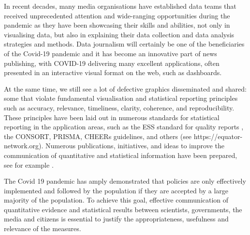\documentclass[article]{jdssv}\usepackage[]{graphicx}\usepackage[]{color}
\begin{document}
In recent decades, many media organisations have established data teams that received unprecedented attention and wide-ranging opportunities during the pandemic as they have been showcasing their skills and abilities, not only in visualising data, but also in explaining their data collection and data analysis strategies and methods. Data journalism will certainly be one of the beneficiaries of the Covid-19 pandemic and it has become an innovative part of news publishing, with COVID-19 delivering many excellent applications, often presented in an interactive visual format on the web, such as dashboards.


At the same time, we still see a lot of defective graphics disseminated and shared: some that violate fundamental visualisation and statistical reporting principles such as accuracy, relevance, timeliness, clarity, coherence, and reproducibility. These principles have been laid out in numerous standards for statistical reporting in the application areas, such as the ESS standard for quality reports \citep{ess2009}, the CONSORT, PRISMA, CHEERs guidelines, and others (see https://equator-network.org). Numerous publications, initiatives, and ideas to improve the communication of quantitative and statistical information have been prepared, see for example \cite{Hoffrage2261,Tufte2001,Rosling2011,otavamylona2020}.

The Covid 19 pandemic has amply demonstrated that policies are only effectively implemented and followed by the population if they are accepted by a large majority of the population. To achieve this goal, effective communication of quantitative evidence and statistical results between scientists, governments, the media and citizens is essential to justify the appropriateness, usefulness and relevance of the measures. 
\end{document}
